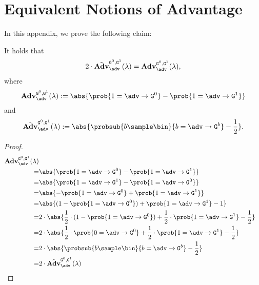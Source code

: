 \section{Equivalent Notions of Advantage}\label{app:calculus}
In this appendix, we prove the following claim:
\begin{claim}
    It holds that
    \begin{equation*}
        2\cdot\tilde{\mathbf{Adv}}_\adv^{\M{G}^0,\M{G}^1}(\lambda)=\mathbf{Adv}_\adv^{\M{G}^0,\M{G}^1}(\lambda),
    \end{equation*}
    where
    \[\mathbf{Adv}_\adv^{\M{G}^0,\M{G}^1}(\lambda):=\abs{\prob{1 = \adv \circ \M{G}^0} - \prob{1 = \adv \circ \M{G}^1}}\]
    and
    \[\tilde{\mathbf{Adv}}_\adv^{\M{G}^0,\M{G}^1}(\lambda):=\abs{\probsub{b\sample\bin}{b = \adv \circ \M{G}^b} - \frac{1}{2}}.\]
\end{claim}
\begin{proof}
    \begin{align*}
        \mathbf{Adv}_\adv^{\M{G}^0,\M{G}^1}(\lambda)                                                                                      \\
        = & \abs{\prob{1 = \adv \circ \M{G}^0} - \prob{1 = \adv \circ \M{G}^1}}                                                           \\
        = & \abs{\prob{1 = \adv \circ \M{G}^1}-\prob{1 = \adv \circ \M{G}^0}}                                                             \\
        = & \abs{-\prob{1 = \adv \circ \M{G}^0} + \prob{1 = \adv \circ \M{G}^1}}                                                          \\
        = & \abs{(1-\prob{1 = \adv \circ \M{G}^0}) + \prob{1 = \adv \circ \M{G}^1} - 1}                                                   \\
        = & 2\cdot\abs{\frac{1}{2}\cdot (1-\prob{1 = \adv \circ \M{G}^0}) + \frac{1}{2}\cdot \prob{1 = \adv \circ \M{G}^1} - \frac{1}{2}} \\
        = & 2\cdot\abs{\frac{1}{2}\cdot \prob{0 = \adv \circ \M{G}^0} + \frac{1}{2}\cdot \prob{1 = \adv \circ \M{G}^1} - \frac{1}{2}}     \\
        = & 2\cdot\abs{\probsub{b\sample\bin}{b = \adv \circ \M{G}^b} - \frac{1}{2}}                                                      \\
        = & 2\cdot\tilde{\mathbf{Adv}}_\adv^{\M{G}^0,\M{G}^1}(\lambda)                                                                    \\
    \end{align*}
\end{proof}

